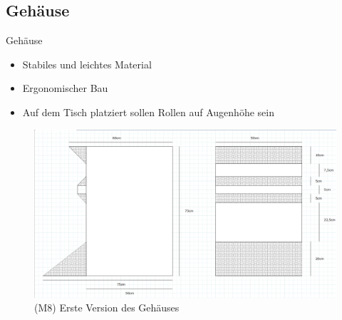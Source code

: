 \documentclass[mathserif,9pt]{article}
\begin{document}
    \subsection{Gehäuse}
    \begin{frame}{Gehäuse}
        \begin{block}{}
            \begin{itemize}
                \item Stabiles und leichtes Material
                \item Ergonomischer Bau
                \item Auf dem Tisch platziert sollen Rollen auf Augenhöhe sein
            \end{itemize}
            \begin{figure}
                \centering
                \includegraphics[height=0.4\paperheight]{img/gehause.png}
                \caption[M8]{(M8) Erste Version des Geh\"auses}
                \label{fig:gehausev1}
            \end{figure}
        \end{block}
    \end{frame}
    
\end{document}
